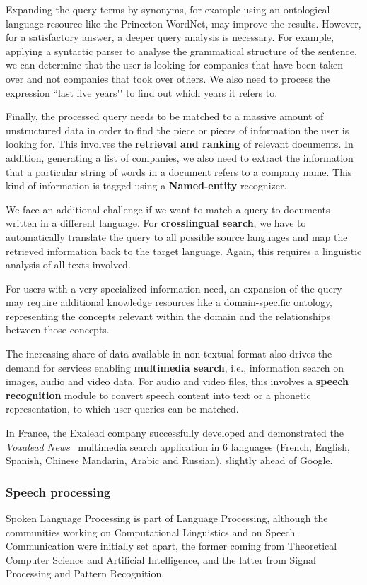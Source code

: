 \begin{multicols}{2}
Expanding the query terms by synonyms, for example using an
ontological language resource like the Princeton WordNet, may improve
the results. However, for a satisfactory answer, a deeper query
analysis is necessary. For example, applying a syntactic parser to
analyse the grammatical structure of the sentence, we can determine
that the user is looking for companies that have been taken over and
not companies that took over others. We also need to process the
expression ``last five years{\mbox '}{\mbox '} to find out which years it refers to.

Finally, the processed query needs to be matched to a massive amount
of unstructured data in order to find the piece or pieces of
information the user is looking for. This involves the {\bf retrieval and
ranking} of relevant documents. In addition, generating a list of
companies, we also need to extract the information that a particular
string of words in a document refers to a company name. This kind of
information is tagged using a {\bf Named-entity} recognizer.

We face an additional challenge if we want to match a query to
documents written in a different language. For {\bf crosslingual search}, we
have to automatically translate the query to all possible source
languages and map the retrieved information back to the target
language. Again, this requires a linguistic analysis of all texts
involved.

For users with a very specialized information need, an expansion of
the query may require additional knowledge resources like a
domain-specific ontology, representing the concepts relevant within
the domain and the relationships between those concepts.

The increasing share of data available in non-textual format also
drives the demand for services enabling {\bf multimedia search}, i.e.,
information search on images, audio and video data. For audio and
video files, this involves a {\bf speech recognition} module to convert
speech content into text or a phonetic representation, to which user
queries can be matched.

In France, the Exalead company successfully developed and demonstrated
the {\em Voxalead News}~\cite{voxaleadnews} multimedia search application in 6 languages
(French, English, Spanish, Chinese Mandarin, Arabic and Russian),
slightly ahead of Google.

\subsubsection{Speech processing} 
Spoken Language Processing is part of Language Processing, although
the communities working on Computational Linguistics and on Speech
Communication were initially set apart, the former coming from
Theoretical Computer Science and Artificial Intelligence, and the
latter from Signal Processing and Pattern Recognition.


\end{multicols}
